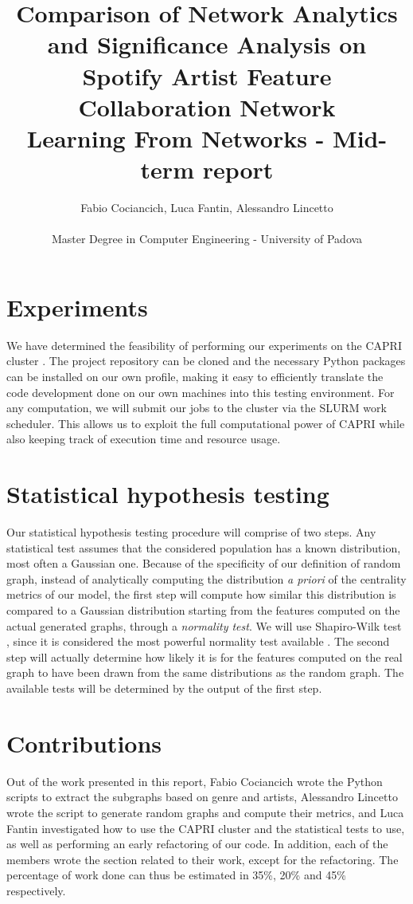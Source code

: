 \documentclass[a4paper, 12pt, conference]{ieeeconf}      %
\title{Comparison of Network Analytics and Significance Analysis on Spotify Artist Feature Collaboration Network\\
\large Learning From Networks - Mid-term report \\}
\author{Fabio Cociancich, Luca Fantin, Alessandro Lincetto %
\\\\ Master Degree in Computer Engineering - University of Padova \\
}
\begin{document}
\maketitle
\thispagestyle{plain}
\pagestyle{plain}



\section{Experiments}

We have determined the feasibility of performing our experiments on the CAPRI cluster \cite{capri}. The project repository can be cloned and the necessary Python packages can be installed on our own profile, making it easy to efficiently translate the code development done on our own machines into this testing environment. For any computation, we will submit our jobs to the cluster via the SLURM work scheduler. This allows us to exploit the full computational power of CAPRI while also keeping track of execution time and resource usage.

\section{Statistical hypothesis testing}

Our statistical hypothesis testing procedure will comprise of two steps. Any statistical test assumes that the considered population has a known distribution, most often a Gaussian one. Because of the specificity of our definition of random graph, instead of analytically computing the distribution \emph{a priori} of the centrality metrics of our model, the first step will compute how similar this distribution is compared to a Gaussian distribution starting from the features computed on the actual generated graphs, through a \emph{normality test}. We will use Shapiro-Wilk test \cite{ShapiroWilk1965}, since it is considered the most powerful normality test available \cite{RazaliYap2011}. The second step will actually determine how likely it is for the features computed on the real graph to have been drawn from the same distributions as the random graph. The available tests will be determined by the output of the first step.

\section*{Contributions}

Out of the work presented in this report, Fabio Cociancich wrote the Python scripts to extract the subgraphs based on genre and artists, Alessandro Lincetto wrote the script to generate random graphs and compute their metrics, and Luca Fantin investigated how to use the CAPRI cluster and the statistical tests to use, as well as performing an early refactoring of our code. In addition, each of the members wrote the section related to their work, except for the refactoring. The percentage of work done can thus be estimated in 35\%, 20\% and 45\% respectively.
\end{document}

